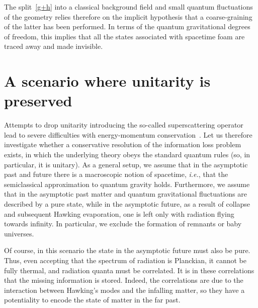 \documentclass[prd,groupedaddress, showpacs, showkeys, onecolumn, nofootinbib, 12pt]{revtex4-2}
\def\ie{{\em i.e.\/}}%
\begin{document}
The split~\eqref{g+h} into a classical background field and small quantum fluctuations of the geometry relies therefore on the implicit hypothesis that a coarse-graining of the latter has been performed.  In terms of the quantum gravitational degrees of freedom, this implies that all the states associated with spacetime foam are traced away and made invisible.

\section{A scenario where unitarity is preserved}
\label{sec:scenario}

Attempts to drop unitarity introducing the so-called superscattering operator~\cite{Hawking:1982dj} lead to severe difficulties with energy-momentum conservation~\cite{Banks:1983by}.  Let us therefore investigate whether a conservative resolution of the information loss problem exists, in which the underlying theory obeys the standard quantum rules (so, in particular, it is unitary).  As a general setup, we assume that in the asymptotic past and future there is a macroscopic notion of spacetime, \ie, that the semiclassical approximation to quantum gravity holds.  Furthermore, we assume that in the asymptotic past matter and quantum gravitational fluctuations are described by a pure state, while in the asymptotic future, as a result of collapse and subsequent Hawking evaporation, one is left only with radiation flying towards infinity.  In particular, we exclude the formation of remnants or baby universes.

Of course, in this scenario the state in the asymptotic future must also be pure.  Thus, even accepting that the spectrum of radiation is Planckian, it cannot be fully thermal, and radiation quanta must be correlated.  It is in these correlations that the missing information is stored.  Indeed, the correlations are due to the interaction between Hawking's modes and the infalling matter, so they have a potentiality to encode the state of matter in the far past. 
\end{document}
